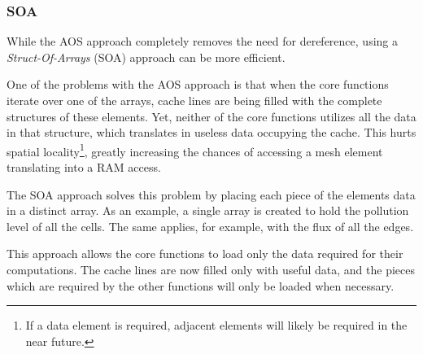 \subsubsection{SOA}
\label{sec:322}


While the AOS approach completely removes the need for dereference, using a \textit{Struct-Of-Arrays} (SOA) approach can be more efficient.

One of the problems with the AOS approach is that when the core functions iterate over one of the arrays, cache lines are being filled with the complete structures of these elements.
Yet, neither of the core functions utilizes all the data in that structure, which translates in useless data occupying the cache.
This hurts spatial locality\footnote{If a data element is required, adjacent elements will likely be required in the near future.}, greatly increasing the chances of accessing a mesh element translating into a RAM access.

The SOA approach solves this problem by placing each piece of the elements data in a distinct array. As an example, a single array is created to hold the pollution level of all the cells.
The same applies, for example, with the flux of all the edges.

This approach allows the core functions to load only the data required for their computations.
The cache lines are now filled only with useful data, and the pieces which are required by the other functions will only be loaded when necessary.
